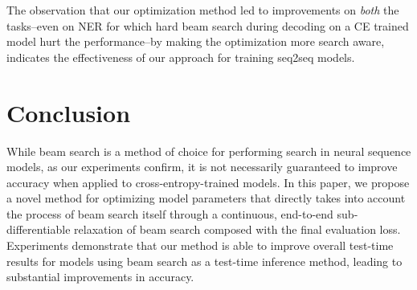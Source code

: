 \documentclass[letterpaper]{article} \usepackage{aaai18}  \usepackage{times}  \usepackage{helvet}  \usepackage{courier}  \usepackage{url}  \usepackage{graphicx}  \frenchspacing
\begin{document}
The observation that our optimization method led to improvements on \emph{both} the tasks--even on NER for which hard beam search during decoding on a CE trained model hurt the performance--by making the optimization more search aware, indicates the effectiveness of our approach for training seq2seq models.
\section{Conclusion}
While beam search is a method of choice for performing search in neural sequence models, as our experiments confirm, it is not necessarily guaranteed to improve accuracy when applied to cross-entropy-trained models.
In this paper, we propose a novel method for optimizing model parameters that directly takes into account the process of beam search itself through a continuous, end-to-end sub-differentiable relaxation of beam search composed with the final evaluation loss.
Experiments demonstrate that our method is able to improve overall test-time results for models using beam search as a test-time inference method, leading to substantial improvements in accuracy.



\end{document}
